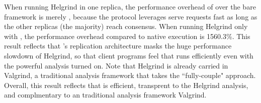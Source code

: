 When running Helgrind in one replica, the performance overhead of \xxx over the 
bare framework is merely \overhead, because the \paxos protocol \xxx leverages 
serve requests fast as long as the other replicas (the majority) reach 
consensus. When running Helgrind only with \mediatomb, the performance overhead 
compared to native execution is 1560.3\%. This result reflects that \xxx's 
replication architecture masks the huge performance slowdown of Helgrind, so 
that client programs feel that \mediatomb runs efficiently even with the 
powerful analysis turned on. Note that Helgrind is already carried in Valgrind, 
a traditional analysis framework that takes the ``fully-couple" approach. 
Overall, this result reflects that \xxx is efficient, transprent to the 
Helgrind analysis, and complmentary to an traditional analysis framework 
Valgrind.
